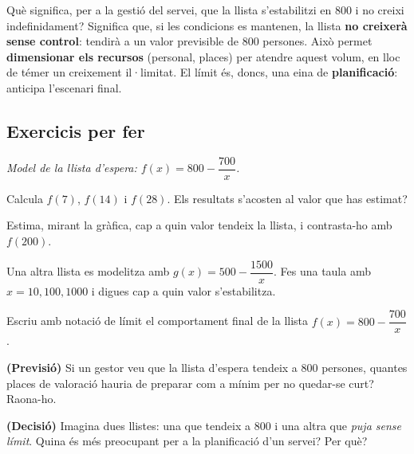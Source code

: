 \begin{exresolt}
Què significa, per a la gestió del servei, que la llista s'estabilitzi en $800$ i no
creixi indefinidament?
\solucio
Significa que, si les condicions es mantenen, la llista \textbf{no creixerà sense
control}: tendirà a un valor previsible de $800$ persones. Això permet
\textbf{dimensionar els recursos} (personal, places) per atendre aquest volum, en lloc
de témer un creixement il·limitat. El límit és, doncs, una eina de
\textbf{planificació}: anticipa l'escenari final.
\end{exresolt}

\subsection{Exercicis per fer}

\noindent\textit{Model de la llista d'espera: $f(x)=800-\dfrac{700}{x}$.}

\begin{exercicis}
\begin{exlist}
  \item Calcula $f(7)$, $f(14)$ i $f(28)$. Els resultats s'acosten al valor que has
        estimat?
  \item Estima, mirant la gràfica, cap a quin valor tendeix la llista, i contrasta-ho
        amb $f(200)$.
  \item Una altra llista es modelitza amb $g(x)=500-\dfrac{1500}{x}$. Fes una taula amb
        $x=10,100,1000$ i digues cap a quin valor s'estabilitza.
  \item Escriu amb notació de límit el comportament final de la llista
        $f(x)=800-\dfrac{700}{x}$.
  \item \textbf{(Previsió)} Si un gestor veu que la llista d'espera tendeix a $800$
        persones, quantes places de valoració hauria de preparar com a mínim per no
        quedar-se curt? Raona-ho.
  \item \textbf{(Decisió)} Imagina dues llistes: una que tendeix a $800$ i una altra
        que \emph{puja sense límit}. Quina és més preocupant per a la planificació d'un
        servei? Per què?
\end{exlist}
\end{exercicis}

